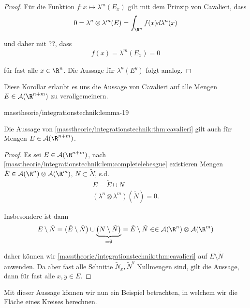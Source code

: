 \documentclass[letterpaper,10pt,german]{jupyterBook}
\begin{document}
\begin{proof}
 Für die Funktion \(f:x\mapsto \lambda^m(E_x)\) gilt mit dem Prinzip von Cavalieri, dass
\begin{align*}
0 = \lambda^{n}\otimes\lambda^{m}(E) = \int_{\R^n} f(x)d\lambda^n(x)
\end{align*}
\par
und daher mit ??, dass
\begin{align*}
f(x)=\lambda^m(E_x)=0
\end{align*}
\par
für fast alle \(x\in\R^n\). Die Aussage für \(\lambda^n(E^y)\) folgt analog.
\end{proof}

\par
Diese Korollar erlaubt es uns die Aussage von Cavalieri auf alle Mengen \(E\in \mathcal{A}(\R^{n+m})\) zu verallgemeinern.
\begin{lemma}{}{masstheorie/integrationstechnik:lemma-19}



\par
Die Aussage von \cref{masstheorie/integrationstechnik:thm:cavalieri} gilt auch für Mengen \(E\in \mathcal{A}(\R^{n+m})\).
\end{lemma}

\begin{proof}
 Es sei \(E\in \mathcal{A}(\R^{n+m})\), nach \cref{masstheorie/integrationstechnik:lem:completelebesgue} existieren Mengen \(\tilde{E}\in\mathcal{A}(\R^n)\otimes\mathcal{A}(\R^m)\), \(N\subset \tilde{N}\), s.d.
\begin{align*}
E = \tilde{E}\cup N\\
(\lambda^n\otimes\lambda^m)(\tilde{N}) = 0.
\end{align*}
\par
Insbesondere ist dann
\begin{align*}
E\setminus \tilde{N} = \left(\tilde{E}\setminus \tilde{N} \right)\cup \underbrace{\left(N\setminus \tilde{N}\right)}_{=\emptyset} = 
\tilde{E}\setminus \tilde{N}\in \in\mathcal{A}(\R^n)\otimes\mathcal{A}(\R^m)
\end{align*}
\par
daher können wir \cref{masstheorie/integrationstechnik:thm:cavalieri} auf \(E\setminus \tilde{N}\) anwenden. Da aber fast alle Schnitte \(\tilde{N}_x,\tilde{N}^y\) Nullmengen sind, gilt die Aussage, dann für fast alle \(x,y\in E\).
\end{proof}

\par
Mit dieser Aussage können wir nun ein Beispiel betrachten, in welchem wir die Fläche eines Kreises berechnen.
\end{document}
